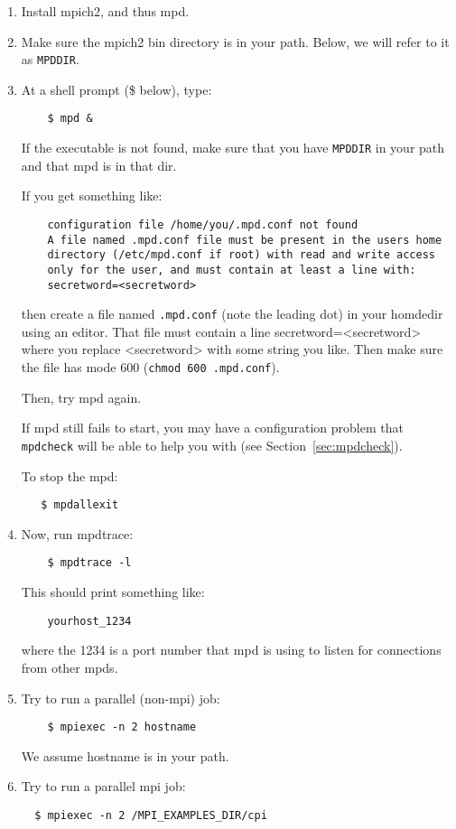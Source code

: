 \documentclass[dvipdfm,11pt]{article}
\begin{document}
\begin{enumerate}
\item Install mpich2, and thus mpd.

\item Make sure the mpich2 bin directory is in your path.
Below, we will refer to it as \texttt{MPDDIR}.

\item At a shell prompt (\$ below), type:
\begin{verbatim}
    $ mpd &
\end{verbatim}
If the executable is not found, make sure that you have
\texttt{MPDDIR} in your path and that mpd is in that dir.

If you get something like:
\begin{verbatim}
    configuration file /home/you/.mpd.conf not found
    A file named .mpd.conf file must be present in the users home
    directory (/etc/mpd.conf if root) with read and write access
    only for the user, and must contain at least a line with:
    secretword=<secretword>
\end{verbatim}
then create a file named \texttt{.mpd.conf} (note the leading dot) in your
homdedir using an editor.  That file must contain a line
secretword=<secretword> where you replace <secretword> with some string
you like.  Then make sure the file has mode 600 (\texttt{chmod 600 .mpd.conf}).

Then, try mpd again.


If mpd still fails to start, you may have a configuration problem that
\texttt{mpdcheck} will be able to help you with (see
Section~\ref{sec:mpdcheck}).

To stop the mpd:
\begin{verbatim}
   $ mpdallexit
\end{verbatim}


\item Now, run mpdtrace:
\begin{verbatim}
    $ mpdtrace -l
\end{verbatim}

This should print something like:
\begin{verbatim}
    yourhost_1234
\end{verbatim}
where the 1234 is a port number that mpd is using to listen for
connections from other mpds.

\item Try to run a parallel (non-mpi) job:
\begin{verbatim}
    $ mpiexec -n 2 hostname    
\end{verbatim}
We assume \texttt{}hostname is in your path.

\item Try to run a parallel mpi job:
\begin{verbatim}
  $ mpiexec -n 2 /MPI_EXAMPLES_DIR/cpi    
\end{verbatim}

\end{enumerate}
\end{document}
